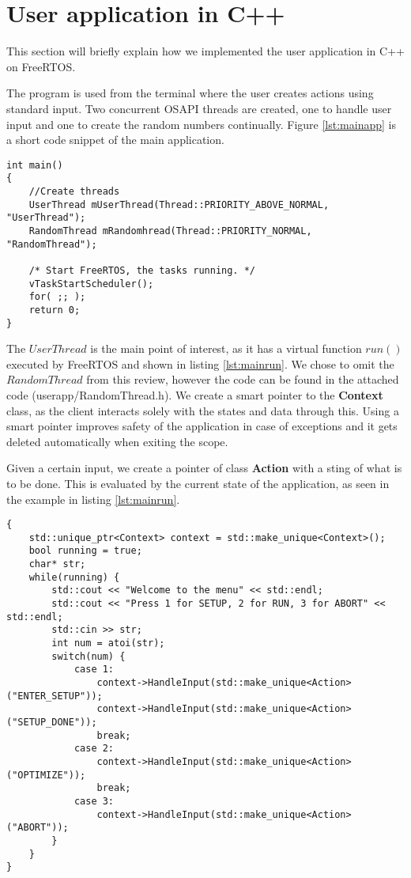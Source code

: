 \section{User application in C++}\label{sec:userapp}

This section will briefly explain how we implemented the user application in C++ on FreeRTOS. 

The program is used from the terminal where the user creates actions using standard input. Two concurrent OSAPI threads are created, one to handle user input and one to create the random numbers continually. Figure \ref{lst:mainapp} is a short code snippet of the main application.

\begin{lstlisting}[style=customc++,caption={Main application, where two threads are created and the scheduler started.},label={lst:mainapp}]
int main()
{
	//Create threads
	UserThread mUserThread(Thread::PRIORITY_ABOVE_NORMAL, "UserThread");
	RandomThread mRandomhread(Thread::PRIORITY_NORMAL, "RandomThread");

	/* Start FreeRTOS, the tasks running. */
	vTaskStartScheduler();
	for( ;; );
	return 0;
}
\end{lstlisting}

The $UserThread$ is the main point of interest, as it has a virtual function $run()$ executed by FreeRTOS and shown in listing \ref{lst:mainrun}. We chose to omit the $RandomThread$ from this review, however the code can be found in the attached code (userapp/RandomThread.h). We create a smart pointer to the \textbf{Context} class, as the client interacts solely with the states and data through this. Using a smart pointer improves safety of the application in case of exceptions and it gets deleted automatically when exiting the scope. 

Given a certain input, we create a pointer of class \textbf{Action} with a sting of what is to be done. This is evaluated by the current state of the application, as seen in the example in listing \ref{lst:mainrun}.

\begin{lstlisting}[style=customc++,caption={Main application, where two threads are created with a scheduler.},label={lst:mainrun}]
{
	std::unique_ptr<Context> context = std::make_unique<Context>();
	bool running = true;
	char* str;
	while(running) {
		std::cout << "Welcome to the menu" << std::endl;
		std::cout << "Press 1 for SETUP, 2 for RUN, 3 for ABORT" << std::endl;
		std::cin >> str;
		int num = atoi(str);
		switch(num) {
			case 1:
				context->HandleInput(std::make_unique<Action>("ENTER_SETUP"));
				context->HandleInput(std::make_unique<Action>("SETUP_DONE"));
				break;
			case 2:
				context->HandleInput(std::make_unique<Action>("OPTIMIZE"));
				break;
			case 3:
				context->HandleInput(std::make_unique<Action>("ABORT"));
		}
	}
}
\end{lstlisting}

